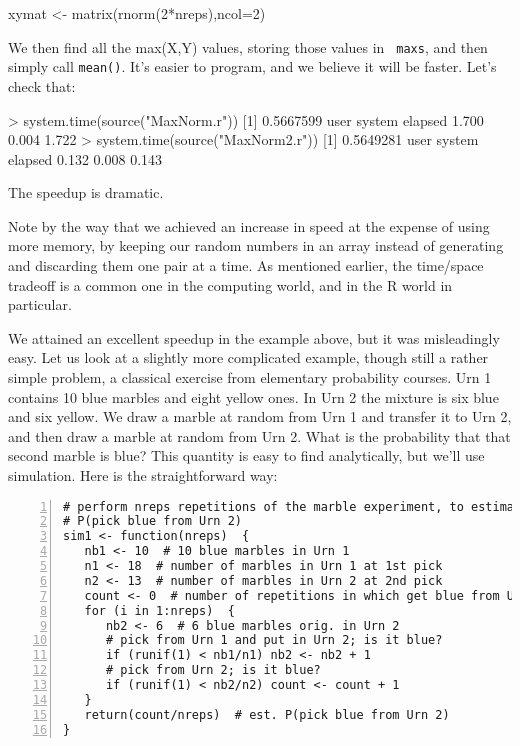 \begin{Code}
xymat <- matrix(rnorm(2*nreps),ncol=2)
\end{Code}

\noindent
We then find all the max(X,Y) values, storing those values in {\tt
maxs}, and then simply call {\tt mean()}.  It's easier to program, and
we believe it will be faster.  Let's check that:

\begin{Code}
> system.time(source("MaxNorm.r"))
[1] 0.5667599
   user  system elapsed
  1.700   0.004   1.722
> system.time(source("MaxNorm2.r"))
[1] 0.5649281
   user  system elapsed
  0.132   0.008   0.143
\end{Code}

\noindent
The speedup is dramatic.  

Note by the way that we achieved an increase in speed at the expense of
using more memory, by keeping our random numbers in an array instead of
generating and discarding them one pair at a time.  As mentioned
earlier, the time/space tradeoff is a common one in the computing world,
and in the R world in particular.

We attained an excellent speedup in the example above, but it was
misleadingly easy.  Let us look at a slightly more complicated example,
though still a rather simple problem, a classical exercise from
elementary probability courses. Urn 1 contains 10 blue marbles and eight
yellow ones. In Urn 2 the mixture is six blue and six yellow. We draw a
marble at random from Urn 1 and transfer it to Urn 2, and then draw a
marble at random from Urn 2. What is the probability that that second
marble is blue?  This quantity is easy to find analytically, but we'll
use simulation. Here is the straightforward way:

\begin{lstlisting}[numbers=left]
# perform nreps repetitions of the marble experiment, to estimate 
# P(pick blue from Urn 2)
sim1 <- function(nreps)  {
   nb1 <- 10  # 10 blue marbles in Urn 1
   n1 <- 18  # number of marbles in Urn 1 at 1st pick
   n2 <- 13  # number of marbles in Urn 2 at 2nd pick
   count <- 0  # number of repetitions in which get blue from Urn 2
   for (i in 1:nreps)  {
      nb2 <- 6  # 6 blue marbles orig. in Urn 2
      # pick from Urn 1 and put in Urn 2; is it blue?
      if (runif(1) < nb1/n1) nb2 <- nb2 + 1
      # pick from Urn 2; is it blue?
      if (runif(1) < nb2/n2) count <- count + 1
   }
   return(count/nreps)  # est. P(pick blue from Urn 2)
}
\end{lstlisting}

